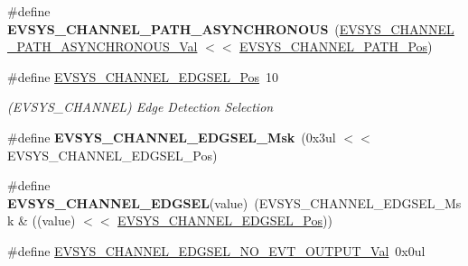 \begin{DoxyCompactItemize}
\item 
\hypertarget{group___s_a_m_l21___e_v_s_y_s_ga6bc286e48c7fe4e5281967d955a29968}{}\#define {\bfseries E\+V\+S\+Y\+S\+\_\+\+C\+H\+A\+N\+N\+E\+L\+\_\+\+P\+A\+T\+H\+\_\+\+A\+S\+Y\+N\+C\+H\+R\+O\+N\+O\+U\+S}~(\hyperlink{group___s_a_m_l21___e_v_s_y_s_gae66529525c793ce0b4621730bd6d5944}{E\+V\+S\+Y\+S\+\_\+\+C\+H\+A\+N\+N\+E\+L\+\_\+\+P\+A\+T\+H\+\_\+\+A\+S\+Y\+N\+C\+H\+R\+O\+N\+O\+U\+S\+\_\+\+Val} $<$$<$ \hyperlink{group___s_a_m_l21___e_v_s_y_s_ga1c99b6755155dc2b405c63587973570b}{E\+V\+S\+Y\+S\+\_\+\+C\+H\+A\+N\+N\+E\+L\+\_\+\+P\+A\+T\+H\+\_\+\+Pos})\label{group___s_a_m_l21___e_v_s_y_s_ga6bc286e48c7fe4e5281967d955a29968}

\item 
\hypertarget{group___s_a_m_l21___e_v_s_y_s_ga940ccedfddf915a4532da9b752cab3a0}{}\#define \hyperlink{group___s_a_m_l21___e_v_s_y_s_ga940ccedfddf915a4532da9b752cab3a0}{E\+V\+S\+Y\+S\+\_\+\+C\+H\+A\+N\+N\+E\+L\+\_\+\+E\+D\+G\+S\+E\+L\+\_\+\+Pos}~10\label{group___s_a_m_l21___e_v_s_y_s_ga940ccedfddf915a4532da9b752cab3a0}

\begin{DoxyCompactList}\small\item\em (E\+V\+S\+Y\+S\+\_\+\+C\+H\+A\+N\+N\+E\+L) Edge Detection Selection \end{DoxyCompactList}\item 
\hypertarget{group___s_a_m_l21___e_v_s_y_s_gaf603adba0ca49498f9d62deee0243386}{}\#define {\bfseries E\+V\+S\+Y\+S\+\_\+\+C\+H\+A\+N\+N\+E\+L\+\_\+\+E\+D\+G\+S\+E\+L\+\_\+\+Msk}~(0x3ul $<$$<$ E\+V\+S\+Y\+S\+\_\+\+C\+H\+A\+N\+N\+E\+L\+\_\+\+E\+D\+G\+S\+E\+L\+\_\+\+Pos)\label{group___s_a_m_l21___e_v_s_y_s_gaf603adba0ca49498f9d62deee0243386}

\item 
\hypertarget{group___s_a_m_l21___e_v_s_y_s_ga72823da9c6e8d38007ac9b0eec58d10f}{}\#define {\bfseries E\+V\+S\+Y\+S\+\_\+\+C\+H\+A\+N\+N\+E\+L\+\_\+\+E\+D\+G\+S\+E\+L}(value)~(E\+V\+S\+Y\+S\+\_\+\+C\+H\+A\+N\+N\+E\+L\+\_\+\+E\+D\+G\+S\+E\+L\+\_\+\+Msk \& ((value) $<$$<$ \hyperlink{group___s_a_m_l21___e_v_s_y_s_ga940ccedfddf915a4532da9b752cab3a0}{E\+V\+S\+Y\+S\+\_\+\+C\+H\+A\+N\+N\+E\+L\+\_\+\+E\+D\+G\+S\+E\+L\+\_\+\+Pos}))\label{group___s_a_m_l21___e_v_s_y_s_ga72823da9c6e8d38007ac9b0eec58d10f}

\item 
\hypertarget{group___s_a_m_l21___e_v_s_y_s_ga80b0403aa00907e545ba1ce27a55b03a}{}\#define \hyperlink{group___s_a_m_l21___e_v_s_y_s_ga80b0403aa00907e545ba1ce27a55b03a}{E\+V\+S\+Y\+S\+\_\+\+C\+H\+A\+N\+N\+E\+L\+\_\+\+E\+D\+G\+S\+E\+L\+\_\+\+N\+O\+\_\+\+E\+V\+T\+\_\+\+O\+U\+T\+P\+U\+T\+\_\+\+Val}~0x0ul\label{group___s_a_m_l21___e_v_s_y_s_ga80b0403aa00907e545ba1ce27a55b03a}


\end{DoxyCompactItemize}
